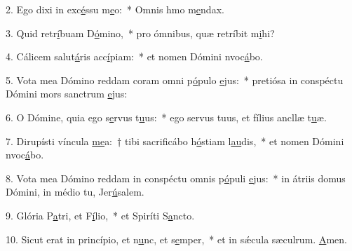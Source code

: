 2. Ego dixi in exc\uline{é}ssu m\uline{e}o:~* Omnis hmo m\uline{e}ndax.\par 
3. Quid retr\uline{í}buam D\uline{ó}mino,~* pro ómnibus, quæ retríbit m\uline{i}hi?\par 
4. Cálicem salut\uline{á}ris acc\uline{í}piam:~* et nomen Dómini nvoc\uline{á}bo.\par 
5. Vota mea Dómino reddam coram omni p\uline{ó}pulo \uline{e}jus:~* pretiósa in conspéctu Dómini mors sanctrum \uline{e}jus:\par 
6. O Dómine, quia ego s\uline{e}rvus t\uline{u}us:~* ego servus tuus, et fílius ancllæ t\uline{u}æ.\par 
7. Dirupísti víncula \uline{me}a:~† tibi sacrificábo h\uline{ó}stiam l\uline{au}dis,~* et nomen Dómini nvoc\uline{á}bo.\par 
8. Vota mea Dómino reddam in conspéctu omnis p\uline{ó}puli \uline{e}jus:~* in átriis domus Dómini, in médio tu, Jer\uline{ú}salem.\par 
9. Glória P\uline{a}tri, et F\uline{í}lio,~* et Spiríti S\uline{a}ncto.\par 
10. Sicut erat in princípio, et n\uline{u}nc, et s\uline{e}mper,~* et in sǽcula sæculrum. \uline{A}men.\par 
